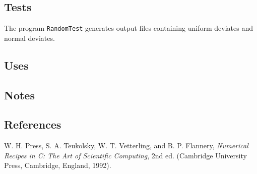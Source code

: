 \documentclass{article}
\begin{document}
\subsection{Tests}

The program \verb+RandomTest+ generates output files containing uniform
deviates and normal deviates.

\subsection{Uses}

\subsection{Notes}

\subsection{References}
\begin{thebibliography}{0}
  W. H. Press, S. A. Teukolsky, W. T. Vetterling, and B. P. Flannery,
  \textit{Numerical Recipes in C: The Art of Scientific Computing}, 2nd ed.
  (Cambridge University Press, Cambridge, England, 1992).
\end{thebibliography}
\end{document}
